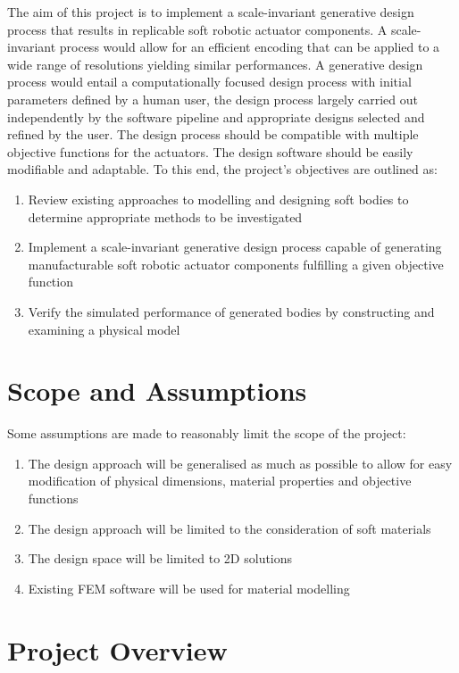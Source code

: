 The aim of this project is to implement a scale-invariant generative design process that results in replicable soft robotic actuator components. A scale-invariant process would allow for an efficient encoding that can be applied to a wide range of resolutions yielding similar performances. A generative design process would entail a computationally focused design process with initial parameters defined by a human user, the design process largely carried out independently by the software pipeline and appropriate designs selected and refined by the user. The design process should be compatible with multiple objective functions for the actuators. The design software should be easily modifiable and adaptable. To this end, the project's objectives are outlined as:

\begin{enumerate}
	\item Review existing approaches to modelling and designing soft bodies to determine appropriate methods to be investigated
	\item Implement a scale-invariant generative design process capable of generating manufacturable soft robotic actuator components fulfilling a given objective function
	\item Verify the simulated performance of generated bodies by constructing and examining a physical model
\end{enumerate}

\section{Scope and Assumptions}
\label{sec:SaA}

Some assumptions are made to reasonably limit the scope of the project:

\begin{enumerate}
	\item The design approach will be generalised as much as possible to allow for easy modification of physical dimensions, material properties and objective functions
	\item The design approach will be limited to the consideration of soft materials
	\item The design space will be limited to 2D solutions
	\item Existing FEM software will be used for material modelling
\end{enumerate}

\section{Project Overview}

